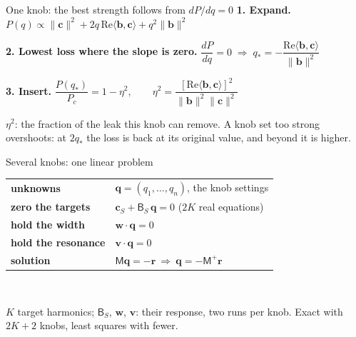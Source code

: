 \documentclass[11pt, aspectratio=169]{beamer}
\begin{document}
\begin{frame}{One knob: the best strength follows from $dP/dq=0$}
    \vspace{0.05cm}
    \textbf{1. Expand.} \hfill
    $P(q)\propto\|\mathbf c\|^2+2q\,\mathrm{Re}\langle\mathbf b,\mathbf c\rangle+q^2\|\mathbf b\|^2$ \hfill\null
    \vspace{0.30cm}

    \textbf{2. Lowest loss where the slope is zero.} \hfill
    $\dfrac{dP}{dq}=0\;\Rightarrow\; q_*=-\dfrac{\mathrm{Re}\langle\mathbf b,\mathbf c\rangle}{\|\mathbf b\|^2}$ \hfill\null
    \vspace{0.30cm}

    \textbf{3. Insert.} \hfill
    $\dfrac{P(q_*)}{P_c}=1-\eta^2,\qquad \eta^2=\dfrac{[\mathrm{Re}\langle\mathbf b,\mathbf c\rangle]^2}{\|\mathbf b\|^2\|\mathbf c\|^2}$ \hfill\null
    \vspace{0.35cm}

    {\footnotesize $\eta^2$: the fraction of the leak this knob can remove. A knob set too strong overshoots: at $2q_*$ the loss is back at its original value, and beyond it is higher.}
\end{frame}

\begin{frame}{Several knobs: one linear problem}
    \vspace{0.10cm}
    \centering
    \renewcommand{\arraystretch}{1.6}
    \begin{tabular}{@{}ll@{}}
        \toprule
        \textbf{unknowns} & $\mathbf q=(q_1,\dots,q_n)$, the knob settings \\
        \textbf{zero the targets} & $\mathbf c_S+\mathsf B_S\,\mathbf q=0$ \quad ($2K$ real equations) \\
        \textbf{hold the width} & $\mathbf w\cdot\mathbf q=0$ \\
        \textbf{hold the resonance} & $\mathbf v\cdot\mathbf q=0$ \\
        \textbf{solution} & $\mathsf M\mathbf q=-\mathbf r\ \Rightarrow\ \mathbf q=-\mathsf M^{+}\mathbf r$ \\
        \bottomrule
    \end{tabular}\\[0.40cm]
    \begin{minipage}{0.90\textwidth}
    {\footnotesize $K$ target harmonics; $\mathsf B_S$, $\mathbf w$, $\mathbf v$: their response, two runs per knob. Exact with $2K+2$ knobs, least squares with fewer.}
    \end{minipage}
\end{frame}
\end{document}

